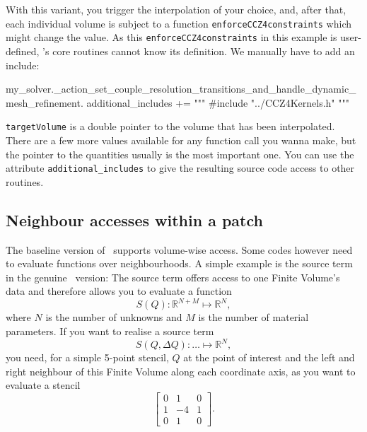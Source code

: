\noindent
With this variant, you trigger the interpolation of your choice, and, after
that, each individual volume is subject to a function
\texttt{enforceCCZ4constraints} which might change the value.
As this \texttt{enforceCCZ4constraints} in this example is user-defined,
\ExaHyPE's core routines cannot know its definition.
We manually have to add an include:

\begin{code}
my_solver._action_set_couple_resolution_transitions_and_handle_dynamic_mesh_refinement.
 additional_includes += """ 
   #include "../CCZ4Kernels.h"
 """
\end{code}



\noindent
\texttt{targetVolume} is a double pointer to the volume that has been interpolated.
There are a few more values available for any function call you wanna make, but
the pointer to the quantities usually is the most important one.
You can use the attribute \texttt{additional\_includes} to give the resulting
source code access to other routines.


\subsection{Neighbour accesses within a patch}

The baseline version of \ExaHyPE\ supports volume-wise access. 
Some codes however need to evaluate functions over neighbourhoods.
A simple example is the source term in the genuine \ExaHyPE\ version:
The source term offers access to one Finite Volume's data and therefore allows you to evaluate a function 
\[
 S(Q): \mathbb{R}^{N+M} \mapsto \mathbb{R}^{N},
\] 
where $N$ is the number of unknowns and $M$ is the number of material parameters.
If you want to realise a source term 
\[
 S(Q,\Delta Q): \ldots \mapsto \mathbb{R}^{N},
\]
you need, for a simple 5-point stencil, $Q$ at the point of interest and the left and right neighbour of this Finite Volume along each coordinate axis,
as you want to evaluate a stencil
\[
 \left[ \begin{array}{ccc}
  0 & 1 & 0 \\
  1 & -4 & 1 \\
  0 & 1 & 0
 \end{array}\right].
\] 

